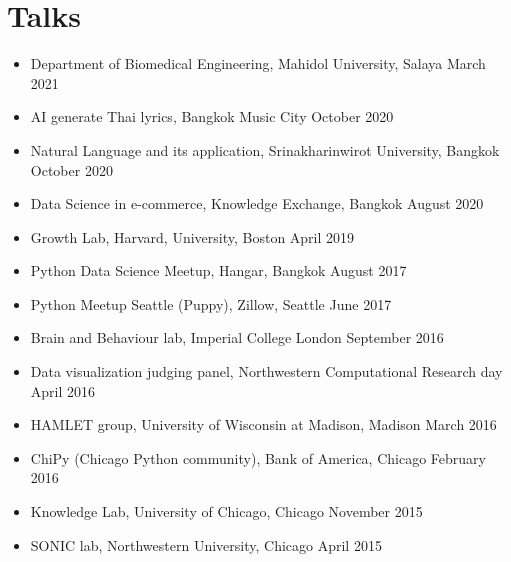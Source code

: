 \section{\sc Talks}

\begin{itemize}[leftmargin=0cm, label={}]

\item Department of Biomedical Engineering, Mahidol University, Salaya \hfill March 2021
\item AI generate Thai lyrics, Bangkok Music City \hfill October 2020
\item Natural Language and its application, Srinakharinwirot University, Bangkok \hfill October 2020
\item Data Science in e-commerce, Knowledge Exchange, Bangkok \hfill August 2020
\item Growth Lab, Harvard, University, Boston \hfill April 2019
\item Python Data Science  Meetup, Hangar, Bangkok \hfill August 2017
\item Python Meetup Seattle (Puppy), Zillow, Seattle \hfill June 2017
\item Brain and Behaviour lab, Imperial College London \hfill September 2016
\item Data visualization judging panel, Northwestern Computational Research day \hfill April 2016
\item HAMLET group, University of Wisconsin at Madison, Madison \hfill March 2016
\item ChiPy (Chicago Python community), Bank of America, Chicago \hfill February 2016
\item Knowledge Lab, University of Chicago, Chicago \hfill November 2015
\item SONIC lab, Northwestern University, Chicago   \hfill April 2015

\end{itemize}